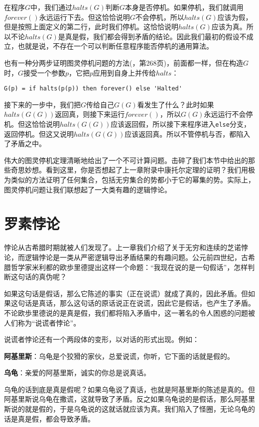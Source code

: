 \documentclass{article}
\begin{document}
在程序$G$中，我们通过$halts(G)$判断$G$本身是否停机。如果停机，我们就调用$forever()$永远运行下去。但这恰恰说明$G$不会停机，所以$halts(G)$应该为假，但是按照上面定义的第二行，此时我们停机。这恰恰说明$halts(G)$应该为真。所以不论$halts(G)$是真是假，我们都会得到矛盾的结论。因此我们最初的假设不成立，也就是说，不存在一个可以判断任意程序能否停机的通用算法。

也有一种分两步证明图灵停机问题的方法(\cite{SICP}，第268页)，前面都一样，但在构造$G$时，$G$接受一个参数$p$，它把$p$应用到自身上并传给$halts$：

\lstset{frame=single}
\begin{lstlisting}
G(p) = if halts(p(p)) then forever() else 'Halted'
\end{lstlisting}

接下来的一步中，我们把$G$传给自己$G(G)$看发生了什么？此时如果$halts(G(G))$返回真，则接下来运行$forever()$，所以$G(G)$永远运行不会停机。但这恰恰说明$halts(G(G))$应该返回假，所以接下来程序进入\texttt{else}分支，返回停机。但这又说明$halts(G(G))$应该返回真。所以不管停机与否，都陷入了矛盾之中。

伟大的图灵停机定理清晰地给出了一个不可计算问题。击碎了我们本节中给出的那些奇思妙想。看到这里，你是否想起了上一章附录中康托尔定理的证明？我们用极为类似的方法证明了任何集合，包括无穷集合的势都小于它的幂集的势。实际上，图灵停机问题让我们联想起了一大类有趣的逻辑悖论。

\section{罗素悖论}

悖论从古希腊时期就被人们发现了。上一章我们介绍了关于无穷和连续的芝诺悖论，而逻辑悖论是一类从严密逻辑导出矛盾结果的有趣问题。公元前四世纪，古希腊哲学家米利都的欧歩里德提出这样一个命题：“我现在说的是一句假话”，怎样判断这句话的真伪呢？

如果这句话是假话，那么它陈述的事实（正在说谎）就成了真的，因此矛盾。但如果这句话是真话，那么这句话的原话说正在说谎，因此它是假话，也产生了矛盾。不论欧歩里德说的是真是假，我们都将陷入矛盾中，这一著名的令人困惑的问题被人们称为“说谎者悖论”。

说谎者悖论还有一个两段体的变形，以对话的形式出现。例如：

\textbf{阿基里斯}：乌龟是个狡猾的家伙，总爱说谎，你听，它下面的话就是假的。

\textbf{乌龟}：亲爱的阿基里斯，诚实的你总是说真话。

乌龟的话到底是真是假呢？如果乌龟说了真话，也就是阿基里斯的陈述是真的。但阿基里斯说乌龟在撒谎，这就导致了矛盾。反之如果乌龟说的是假话，那么阿基里斯说的就是假的，于是乌龟说的这就话就应该为真。我们陷入了怪圈，无论乌龟的话是真是假，都会导致矛盾。
\end{document}
